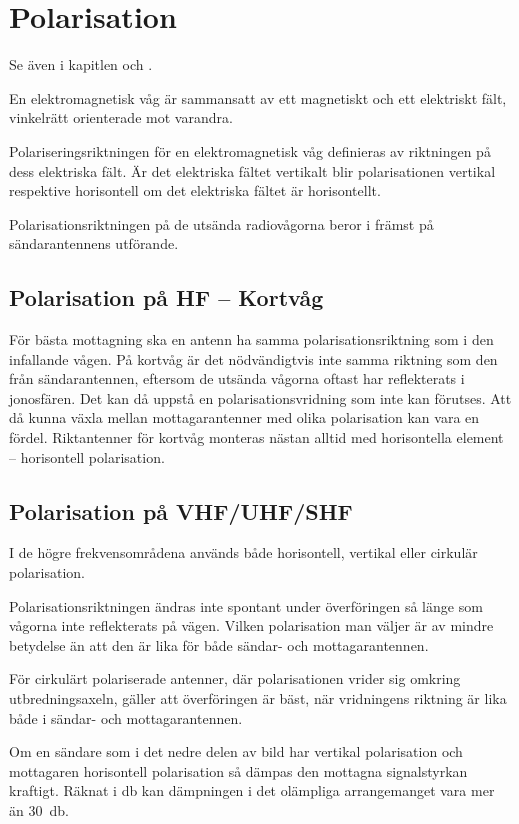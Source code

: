 \section{Polarisation}

Se även i kapitlen  och .

En elektromagnetisk våg är sammansatt av ett magnetiskt och ett
elektriskt fält, vinkelrätt orienterade mot varandra.

Polariseringsriktningen för en elektromagnetisk våg definieras av riktningen på
dess elektriska fält.
Är det elektriska fältet vertikalt blir polarisationen vertikal respektive
horisontell om det elektriska fältet är horisontellt.

Polarisationsriktningen på de utsända radiovågorna beror i främst på
sändarantennens utförande.

\subsection{Polarisation på HF -- Kortvåg}
\label{polarisation_hf}

För bästa mottagning ska en antenn ha samma polarisationsriktning som i den
infallande vågen.
På kortvåg är det nödvändigtvis inte samma riktning som den från
sändarantennen, eftersom de utsända vågorna oftast har reflekterats i
jonosfären.
Det kan då uppstå en polarisationsvridning som inte kan förutses.
Att då kunna växla mellan mottagarantenner med olika polarisation kan vara en
fördel.
Riktantenner för kortvåg monteras nästan alltid med horisontella element --
horisontell polarisation.

\subsection{Polarisation på VHF/UHF/SHF}
\label{polarisation_vhf}


I de högre frekvensområdena används både horisontell, vertikal eller
cirkulär polarisation.

Polarisationsriktningen ändras inte spontant under överföringen så
länge som vågorna inte reflekterats på vägen.
Vilken polarisation man väljer är av mindre betydelse än att den är lika
för både sändar- och mottagarantennen.

För cirkulärt polariserade antenner, där polarisationen vrider sig
omkring utbredningsaxeln, gäller att överföringen är bäst, när
vridningens riktning är lika både i sändar- och mottagarantennen.

Om en sändare som i det nedre delen av bild  har vertikal
polarisation och mottagaren horisontell polarisation så dämpas den mottagna
signalstyrkan kraftigt.
Räknat i \unit{\decibel} kan dämpningen i det olämpliga arrangemanget vara mer än
\qty{30}{\decibel}.
